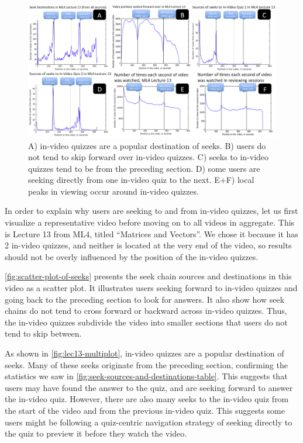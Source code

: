 \documentclass{sigchi}
\begin{document}
\begin{figure}
\includegraphics[width=2.0\columnwidth]{lec13-multiplot}
\caption{A) in-video quizzes are a popular destination of seeks. B) users do not tend to skip forward over in-video quizzes. C) seeks to in-video quizzes tend to be from the preceding section. D) some users are seeking directly from one in-video quiz to the next. E+F) local peaks in viewing occur around in-video quizzes.}
\label{fig:lec13-multiplot}
\end{figure}

In order to explain why users are seeking to and from in-video quizzes, let us first visualize a representative video before moving on to all videos in aggregate. This is Lecture 13 from ML4, titled ``Matrices and Vectors''. We chose it because it has 2 in-video quizzes, and neither is located at the very end of the video, so results should not be overly influenced by the position of the in-video quizzes.

\autoref{fig:scatter-plot-of-seeks} presents the seek chain sources and destinations in this video as a scatter plot. It illustrates users seeking forward to in-video quizzes and going back to the preceding section to look for answers. It also show how seek chains do not tend to cross forward or backward across in-video quizzes. Thus, the in-video quizzes subdivide the video into smaller sections that users do not tend to skip between.

As shown in \autoref{fig:lec13-multiplot}, in-video quizzes are a popular destination of seeks. Many of these seeks originate from the preceding section, confirming the statistics we saw in \autoref{fig:seek-sources-and-destinations-table}. This suggests that users may have found the answer to the quiz, and are seeking forward to answer the in-video quiz. However, there are also many seeks to the in-video quiz from the start of the video and from the previous in-video quiz. This suggests some users might be following a quiz-centric navigation strategy of seeking directly to the quiz to preview it before they watch the video.
\end{document}

